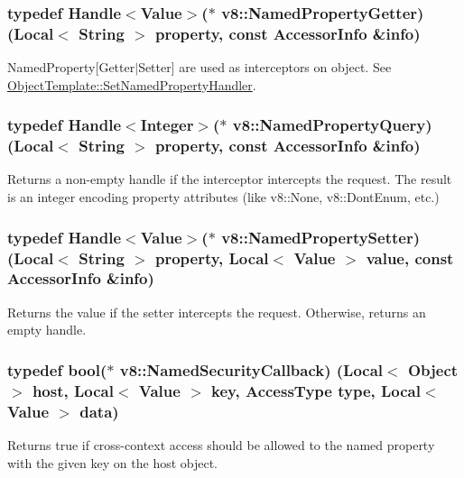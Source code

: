 \subsubsection[{Named\+Property\+Getter}]{\setlength{\rightskip}{0pt plus 5cm}typedef {\bf Handle}$<${\bf Value}$>$($\ast$ v8\+::\+Named\+Property\+Getter) ({\bf Local}$<$ {\bf String} $>$ property, const {\bf Accessor\+Info} \&info)}\label{namespacev8_ab9effde41da1c073eddbd4a11a62bd0b}
Named\+Property\mbox{[}Getter$\vert$\+Setter\mbox{]} are used as interceptors on object. See \hyperlink{classv8_1_1_object_template_aa80e9db593d8b954c4153082dc7a439d}{Object\+Template\+::\+Set\+Named\+Property\+Handler}. \hypertarget{namespacev8_a0136e8102c101d9a39497f75daa9153b}{}
\subsubsection[{Named\+Property\+Query}]{\setlength{\rightskip}{0pt plus 5cm}typedef {\bf Handle}$<${\bf Integer}$>$($\ast$ v8\+::\+Named\+Property\+Query) ({\bf Local}$<$ {\bf String} $>$ property, const {\bf Accessor\+Info} \&info)}\label{namespacev8_a0136e8102c101d9a39497f75daa9153b}
Returns a non-\/empty handle if the interceptor intercepts the request. The result is an integer encoding property attributes (like v8\+::\+None, v8\+::\+Dont\+Enum, etc.) \hypertarget{namespacev8_a682b1fc46feab32605c4905612ffe870}{}
\subsubsection[{Named\+Property\+Setter}]{\setlength{\rightskip}{0pt plus 5cm}typedef {\bf Handle}$<${\bf Value}$>$($\ast$ v8\+::\+Named\+Property\+Setter) ({\bf Local}$<$ {\bf String} $>$ property, {\bf Local}$<$ {\bf Value} $>$ value, const {\bf Accessor\+Info} \&info)}\label{namespacev8_a682b1fc46feab32605c4905612ffe870}
Returns the value if the setter intercepts the request. Otherwise, returns an empty handle. \hypertarget{namespacev8_ab5cafda0c556bba990c660ce9c904e0d}{}
\subsubsection[{Named\+Security\+Callback}]{\setlength{\rightskip}{0pt plus 5cm}typedef bool($\ast$ v8\+::\+Named\+Security\+Callback) ({\bf Local}$<$ {\bf Object} $>$ host, {\bf Local}$<$ {\bf Value} $>$ key, {\bf Access\+Type} type, {\bf Local}$<$ {\bf Value} $>$ data)}\label{namespacev8_ab5cafda0c556bba990c660ce9c904e0d}
Returns true if cross-\/context access should be allowed to the named property with the given key on the host object. \hypertarget{namespacev8_a8ce54c75241be41ff6a25e9944eefd2a}{}

